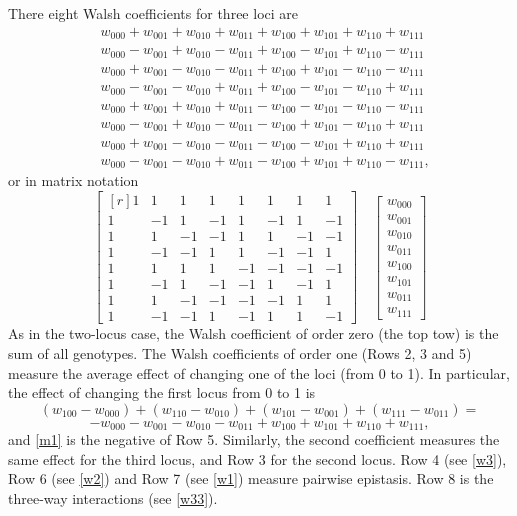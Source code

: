 \documentclass[12pt]{amsart}
\theoremstyle{plain}
\theoremstyle{definition}
\begin{document}
There eight Walsh coefficients for three loci are
\begin{align*}
&  w_{000} + w_{001} + w_{010} + w_{011} + w_{100} + w_{101}+w_{110} + w_{111}  \\
&  w_{000} - w_{001} + w_{010} -  w_{011} + w_{100}  - w_{101}+ w_{110} - w_{111}  \\
&  w_{000} + w_{001} - w_{010} - w_{011} + w_{100} + w_{101} - w_{110} - w_{111}  \\
&  w_{000} -w_{001} - w_{010} +w_{011} +w_{100} - w_{101}- w_{110} + w_{111}  \\
&  w_{000} + w_{001} + w_{010} + w_{011} - w_{100} -w_{101}-w_{110} - w_{111}  \\
&  w_{000} - w_{001} + w_{010} - w_{011} - w_{100} +w_{101}-w_{110} + w_{111}  \\
&  w_{000} + w_{001} -w_{010} -w_{011} - w_{100} -w_{101}+w_{110} + w_{111}  \\
& w_{000} - w_{001} - w_{010} +w_{011} -w_{100} +w_{101}+w_{110} -w_{111} ,
\end{align*}
or in matrix notation
\[
\begin{bmatrix*}[r]
 1  &1  & 1   &  1  &  1  & 1  & 1 &1       \\
 1  &-1  & 1   &  -1  &  1  & -1  & 1 &-1    \\
 1  & 1  & -1   & - 1  &  1  & 1  & - 1 & -1    \\ 
 1  & -1  &  -1   &  1  & 1  & -1  & -1 &1    \\ 
 1  & 1  & 1   &  1  &  -1  & -1  & -1 &-1    \\ 
 1  & -1  & 1   & - 1  &  -1  & 1  & -1 &1    \\ 
 1  & 1  & -1   &  -1  &  -1  & -1  & 1 &1    \\ 
 1  & -1  & -1   &  1  &  -1  & 1  & 1 &-1    
\end{bmatrix*}
\quad
\begin{bmatrix}
 w_{000}   \\
 w_{001}    \\
 w_{010}   \\ 
w_{011}     \\ 
 w_{100}     \\ 
 w_{101}   \\ 
 w_{011}   \\ 
 w_{111}      
\end{bmatrix}
\]
As in the two-locus case,
the Walsh coefficient of order zero (the top tow) is the sum of all genotypes.
The Walsh coefficients of order one (Rows 2, 3 and 5) measure the
 average effect of changing one of the loci (from 0 to 1).
In particular, the  effect of changing the first locus from 0 to 1  is
\[
(w_{100}-w_{000})+ (w_{110}-w_{010}) + (w_{101}-w_{001} ) + (w_{111}-w_{011})=
\]
\begin{equation}\label{m1}
-w_{000} -w_{001} -w_{010}-w_{011}  +  w_{100}  +w_{101}+w_{110}+w_{111},
\end{equation}
and  \ref{m1} is the negative of Row 5.
Similarly,  the second coefficient measures the same effect for the third locus, and Row 3 for the second locus.
Row 4 (see \ref{w3}), Row 6 (see \ref{w2})  and  Row 7 (see \ref{w1})  measure pairwise epistasis.
Row 8 is  the three-way interactions (see \ref{w33}). 
\end{document}
